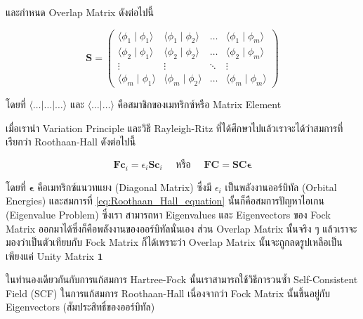\noindent และกำหนด Overlap Matrix ดังต่อไปนี้

\begin{equation}
    \bm{S}
    =
    \left(
    \begin{array}{cccc}
            \langle\phi_1 \mid \phi_1\rangle & \langle\phi_1 \mid \phi_2\rangle &
            \ldots                           & \langle\phi_1 \mid \phi_m\rangle                   \\
            \langle\phi_2 \mid \phi_1\rangle & \langle\phi_2 \mid \phi_2\rangle &
            \ldots                           & \langle\phi_2 \mid \phi_m\rangle                   \\
            \vdots                           & \vdots                           & \ddots & \vdots \\
            \langle\phi_m \mid \phi_1\rangle & \langle\phi_m \mid \phi_2\rangle &
            \ldots                           & \langle\phi_m \mid \phi_m\rangle
        \end{array}
    \right)
\end{equation}

\noindent โดยที่ $\langle \dots | \dots | \dots \rangle$ และ $\langle \dots | \dots \rangle$
คือสมาชิกของเมทริกซ์หรือ Matrix Element

เมื่อเรานำ Variation Principle และวิธี Rayleigh-Ritz ที่ได้ศึกษาไปแล้วเราจะได้ว่าสมการที่เรียกว่า Roothaan-Hall ดังต่อไปนี้

\begin{equation}
    \label{eq:Roothaan_Hall_equation}
    \bm{F c}_i
    =
    \epsilon_i \bm{S c}_i \quad
    \text{ หรือ } \quad
    \bm{FC} = \bm{S C} \boldsymbol{\epsilon}
\end{equation}

\noindent โดยที่ $\boldsymbol{\epsilon}$ คือเมทริกซ์แนวทแยง (Diagonal Matrix) ซึ่งมี $\epsilon_i$ เป็นพลังงานออร์บิทัล
(Orbital Energies) และสมการที่ \eqref{eq:Roothaan_Hall_equation} นั้นก็คือสมการปัญหาไอเกน (Eigenvalue Problem) ซึ่งเรา%
สามารถหา Eigenvalues และ Eigenvectors ของ Fock Matrix ออกมาได้ซึ่งก็คือพลังงานของออร์บิทัลนั่นเอง ส่วน Overlap Matrix
นั้นจริง ๆ แล้วเราจะมองว่าเป็นตัวเทียบกับ Fock Matrix ก็ได้เพราะว่า Overlap Matrix นั้นจะถูกลดรูปเหลือเป็นเพียงแค่ Unity Matrix
$\bm{1}$

ในทำนองเดียวกันกับการแก้สมการ Hartree-Fock นั้นเราสามารถใช้วิธีการวนซ้ำ Self-Consistent Field (SCF) ในการแก้สมการ
Roothaan-Hall เนื่องจากว่า Fock Matrix นั้นขึ้นอยู่กับ Eigenvectors (สัมประสิทธิ์ของออร์บิทัล)

